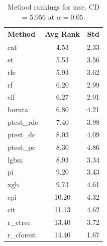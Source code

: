 \begin{table}[h]
\centering
\caption{Method rankings for mse. CD = 5.956 at $\alpha=0.05$.}
\label{tab:ranks_mse}
\begin{tabular}{lcc}
\toprule
Method & Avg Rank & Std \\
\midrule
cat & 4.53 & 2.33 \\
et & 5.53 & 3.56 \\
rfe & 5.93 & 3.62 \\
rf & 6.20 & 2.99 \\
cif & 6.27 & 2.91 \\
boruta & 6.80 & 4.21 \\
ptest_rdc & 7.40 & 3.98 \\
ptest_dc & 8.03 & 4.09 \\
ptest_pc & 8.30 & 4.86 \\
lgbm & 8.93 & 3.34 \\
pi & 9.20 & 3.43 \\
xgb & 9.73 & 4.61 \\
cpi & 10.20 & 4.32 \\
cit & 11.13 & 4.62 \\
r_ctree & 13.40 & 3.72 \\
r_cforest & 14.40 & 1.67 \\
\bottomrule
\end{tabular}
\end{table}